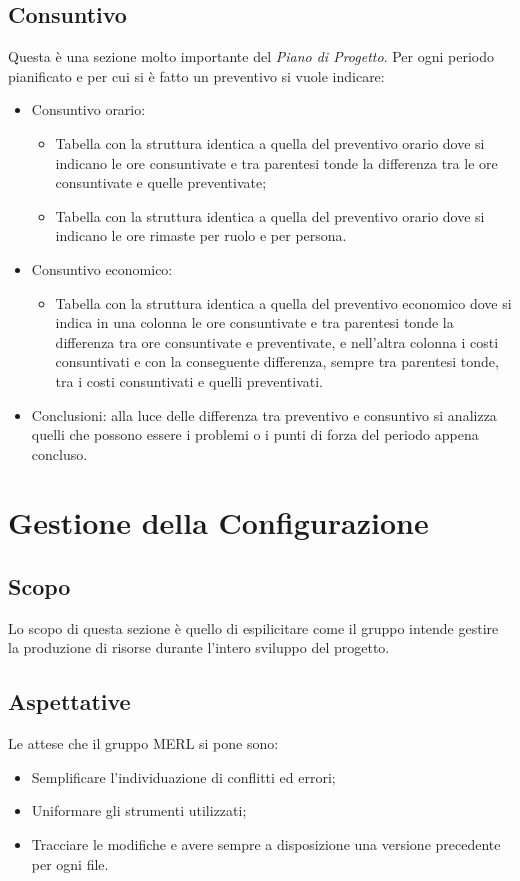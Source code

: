 \subsection{Consuntivo}
Questa è una sezione molto importante del \textit{Piano di Progetto}.
Per ogni periodo pianificato e per cui si è fatto un preventivo si vuole indicare:
\begin{itemize}
    \item Consuntivo orario:
        \begin{itemize}
            \item Tabella con la struttura identica a quella del preventivo orario dove si indicano le ore consuntivate e tra parentesi tonde la differenza tra le ore consuntivate e quelle preventivate;
            \item Tabella con la struttura identica a quella del preventivo orario dove si indicano le ore rimaste per ruolo e per persona.
        \end{itemize}
    \item Consuntivo economico:
        \begin{itemize}
            \item Tabella con la struttura identica a quella del preventivo economico dove si indica in una colonna le ore consuntivate e tra parentesi tonde la differenza tra ore consuntivate e preventivate, e nell'altra colonna i costi consuntivati e con la conseguente differenza, sempre tra parentesi tonde, tra i costi consuntivati e quelli preventivati.
        \end{itemize}
    \item Conclusioni: alla luce delle differenza tra preventivo e consuntivo si analizza quelli che possono essere i problemi o i punti di forza del periodo appena concluso.
\end{itemize}


\section{Gestione della Configurazione}
\subsection{Scopo}
    Lo scopo di questa sezione è quello di espilicitare come il gruppo intende gestire la produzione di
    risorse durante l'intero sviluppo del progetto.
 \subsection{Aspettative}
    Le attese che il gruppo MERL si pone sono:
    \begin{itemize}
        \item Semplificare l'individuazione di conflitti ed errori;
        \item Uniformare gli strumenti utilizzati;
        \item Tracciare le modifiche e avere sempre a disposizione una versione precedente per ogni file.
    \end{itemize}
